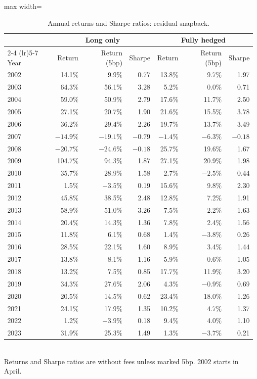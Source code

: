 \documentclass[12pt,letterpaper]{article}
\begin{document}
\begin{table}[!htbp]
\centering
\caption{Annual returns and Sharpe ratios: residual snapback.}
\label{tab:yearly-snap}
\begin{adjustbox}{max width=\linewidth}
\begin{tabular}{lrrrrrr}
\toprule
& \multicolumn{3}{c}{Long only} & \multicolumn{3}{c}{Fully hedged} \\
\cmidrule(lr){2-4} \cmidrule(lr){5-7}
Year & Return & Return (5bp) & Sharpe & Return & Return (5bp) & Sharpe \\
\midrule
2002 & 14.1\% & 9.9\% & 0.77 & 13.8\% & 9.7\% & 1.97 \\
2003 & 64.3\% & 56.1\% & 3.28 & 5.2\% & 0.0\% & 0.71 \\
2004 & 59.0\% & 50.9\% & 2.79 & 17.6\% & 11.7\% & 2.50 \\
2005 & 27.1\% & 20.7\% & 1.90 & 21.6\% & 15.5\% & 3.78 \\
2006 & 36.2\% & 29.4\% & 2.26 & 19.7\% & 13.7\% & 3.49 \\
2007 & $-14.9\%$ & $-19.1\%$ & $-0.79$ & $-1.4\%$ & $-6.3\%$ & $-0.18$ \\
2008 & $-20.7\%$ & $-24.6\%$ & $-0.18$ & 25.7\% & 19.6\% & 1.67 \\
2009 & 104.7\% & 94.3\% & 1.87 & 27.1\% & 20.9\% & 1.98 \\
2010 & 35.7\% & 28.9\% & 1.58 & 2.7\% & $-2.5\%$ & 0.44 \\
2011 & 1.5\% & $-3.5\%$ & 0.19 & 15.6\% & 9.8\% & 2.30 \\
2012 & 45.8\% & 38.5\% & 2.48 & 12.8\% & 7.2\% & 1.91 \\
2013 & 58.9\% & 51.0\% & 3.26 & 7.5\% & 2.2\% & 1.63 \\
2014 & 20.4\% & 14.3\% & 1.36 & 7.8\% & 2.4\% & 1.56 \\
2015 & 11.8\% & 6.1\% & 0.68 & 1.4\% & $-3.8\%$ & 0.26 \\
2016 & 28.5\% & 22.1\% & 1.60 & 8.9\% & 3.4\% & 1.44 \\
2017 & 13.8\% & 8.1\% & 1.16 & 5.9\% & 0.6\% & 1.05 \\
2018 & 13.2\% & 7.5\% & 0.85 & 17.7\% & 11.9\% & 3.20 \\
2019 & 34.3\% & 27.6\% & 2.06 & 4.3\% & $-0.9\%$ & 0.69 \\
2020 & 20.5\% & 14.5\% & 0.62 & 23.4\% & 18.0\% & 1.26 \\
2021 & 24.1\% & 17.9\% & 1.35 & 10.2\% & 4.7\% & 1.37 \\
2022 & 1.2\% & $-3.9\%$ & 0.18 & 9.4\% & 4.0\% & 1.10 \\
2023 & 31.9\% & 25.3\% & 1.49 & 1.3\% & $-3.7\%$ & 0.21 \\
\bottomrule
\end{tabular}
\end{adjustbox}
\\[4pt]
\small Returns and Sharpe ratios are without fees unless marked 5bp. 2002 starts in April.
\end{table}
\end{document}

